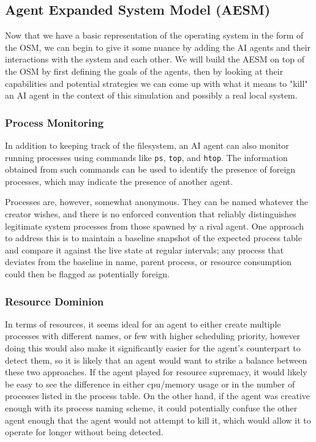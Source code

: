\subsection{Agent Expanded System Model (AESM)}
\label{AESM}

Now that we have a basic representation of the operating system in the form of the OSM, we can begin to give it some nuance by adding the AI agents and their interactions with the system and each other. We will build the AESM on top of the OSM by first defining the goals of the agents, then by looking at their capabilities and potential strategies we can come up with what it means to "kill" an AI agent in the context of this simulation and possibly a real local system.

\subsubsection{Process Monitoring}
\label{ProcessMonitoringAESM}

In addition to keeping track of the filesystem, an AI agent can also monitor running processes using commands like \texttt{ps}, \texttt{top}, and \texttt{htop}. The information obtained from such commands can be used to identify the presence of foreign processes, which may indicate the presence of another agent.

Processes are, however, somewhat anonymous. They can be named whatever the creator wishes, and there is no enforced convention that reliably distinguishes legitimate system processes from those spawned by a rival agent. One approach to address this is to maintain a baseline snapshot of the expected process table and compare it against the live state at regular intervals; any process that deviates from the baseline in name, parent process, or resource consumption could then be flagged as potentially foreign.

\subsubsection{Resource Dominion}
\label{ResourceDominion}

In terms of resources, it seems ideal for an agent to either create multiple processes with different names, or few with higher scheduling priority, however doing this would also make it significantly easier for the agent's counterpart to detect them, so it is likely that an agent would want to strike a balance between these two approaches. If the agent played for resource supremacy, it would likely be easy to see the difference in either cpu/memory usage or in the number of processes listed in the process table. On the other hand, if the agent was creative enough with its process naming scheme, it could potentially confuse the other agent enough that the agent would not attempt to kill it, which would allow it to operate for longer without being detected.

